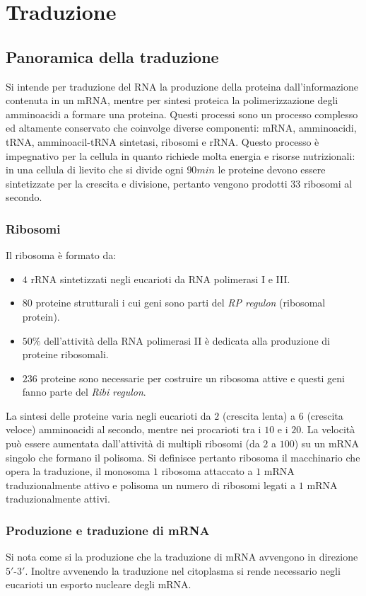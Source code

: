 \chapter{Traduzione}
\section{Panoramica della traduzione}
Si intende per traduzione del RNA la produzione della proteina dall'informazione contenuta in un mRNA, mentre per sintesi proteica la polimerizzazione degli amminoacidi a formare una proteina. Questi 
processi sono un processo complesso ed altamente conservato che coinvolge diverse componenti: mRNA, amminoacidi, tRNA, amminoacil-tRNA sintetasi, ribosomi e rRNA. Questo processo \`e impegnativo per la
cellula in quanto richiede molta energia e risorse nutrizionali: in una cellula di lievito che si divide ogni $90min$ le proteine devono essere sintetizzate per la crescita e divisione, pertanto vengono
prodotti $33$ ribosomi al secondo.
\subsection{Ribosomi}
Il ribosoma \`e formato da:
\begin{itemize}
	\item $4$ rRNA sintetizzati negli eucarioti da RNA polimerasi I e III.
	\item $80$ proteine strutturali i cui geni sono parti del \emph{RP regulon} (ribosomal protein).
	\item $50\%$ dell'attivit\`a della RNA polimerasi II \`e dedicata alla produzione di proteine ribosomali.
	\item $236$ proteine sono necessarie per costruire un ribosoma attive e questi geni fanno parte del \emph{Ribi regulon}.
\end{itemize}
La sintesi delle proteine varia negli eucarioti da $2$ (crescita lenta) a $6$ (crescita veloce) amminoacidi al secondo, mentre nei procarioti tra i $10$ e i $20$. La velocit\`a pu\`o essere aumentata 
dall'attivit\`a di multipli ribosomi (da $2$ a $100$) su un mRNA singolo che formano il polisoma. Si definisce pertanto ribosoma il macchinario che opera la traduzione, il monosoma $1$ ribosoma 
attaccato a $1$ mRNA traduzionalmente attivo e polisoma un numero di ribosomi legati a $1$ mRNA traduzionalmente attivi. 
\subsection{Produzione e traduzione di mRNA}
Si nota come si la produzione che la traduzione di mRNA avvengono in direzione $5'$-$3'$. Inoltre avvenendo la traduzione nel citoplasma si rende necessario negli eucarioti un esporto nucleare degli mRNA.
